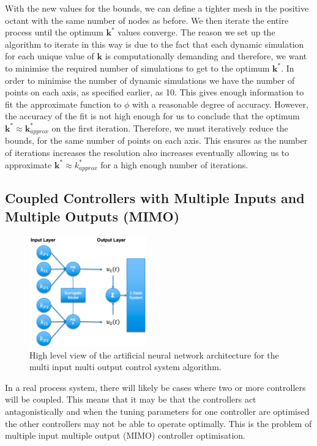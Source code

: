 \documentclass[conference]{IEEEtran}
\theoremstyle{definition}
\begin{document}
With the new values for the bounds, we can define a tighter mesh in the positive octant with the same number of nodes as before. We then iterate the entire process until the optimum $\mathbf{k}^*$ values converge. The reason we set up the algorithm to iterate in this way is due to the fact that each dynamic simulation for each unique value of $\mathbf{k}$ is computationally demanding and therefore, we want to minimise the required number of simulations to get to the optimum $\mathbf{k}^*$. In order to minimise the number of dynamic simulations we have the number of points on each axis, as specified earlier, as 10. This gives enough information to fit the approximate function to $\phi$ with a reasonable degree of accuracy. However, the accuracy of the fit is not high enough for us to conclude that the optimum $\mathbf{k}^* \approx \mathbf{k}_{approx}^*$ on the first iteration. Therefore, we must iteratively reduce the bounds, for the same number of points on each axis. This ensures as the number of iterations increases the resolution also increases eventually allowing us to approximate $\mathbf{k}^* \approx k_{approx}^*$ for a high enough number of iterations.

\subsection{Coupled Controllers with Multiple Inputs and Multiple Outputs (MIMO)}
\begin{figure}
    \centering
    \includegraphics[width=0.45\textwidth]{NN.png}
    \caption{High level view of the artificial neural network architecture for the multi input multi output control system algorithm.}
    \label{neural_network}
\end{figure}
\noindent In a real process system, there will likely be cases where two or more controllers will be coupled. This means that it may be that the controllers act antagonistically and when the tuning parameters for one controller are optimised the other controllers may not be able to operate optimally. This is the problem of multiple input multiple output (MIMO) controller optimisation.
\end{document}
